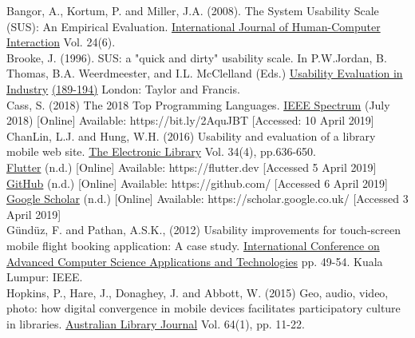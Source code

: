 \documentclass[version=last,fontsize=13pt]{scrartcl}
\begin{document}
Bangor, A., Kortum, P. and Miller, J.A. (2008). The System Usability Scale (SUS): An Empirical Evaluation. \underline{International Journal of Human-Computer Interaction} Vol. 24(6).\\

Brooke, J. (1996). SUS: a "quick and dirty" usability scale. In P.W.Jordan, B. Thomas, B.A. Weerdmeester, and I.L. McClelland (Eds.) \underline{Usability Evaluation in Industry} \underline{(189-194)} London: Taylor and Francis.\\


Cass, S. (2018) The 2018 Top Programming Languages.  \underline{IEEE Spectrum} (July 2018) [Online] Available: https://bit.ly/2AquJBT [Accessed: 10 April 2019]\\

ChanLin, L.J. and Hung, W.H. (2016) Usability and evaluation of a library mobile web site. \underline{The Electronic Library} Vol. 34(4), pp.636-650.\\

\underline{Flutter} (n.d.) [Online] Available: https://flutter.dev [Accessed 5 April 2019]\\

\underline{GitHub} (n.d.) [Online] Available: https://github.com/ [Accessed 6 April 2019]\\

\underline{Google Scholar} (n.d.) [Online] Available: https://scholar.google.co.uk/ [Accessed 3 April 2019]\\

Gündüz, F. and Pathan, A.S.K., (2012) Usability improvements for touch-screen mobile flight booking application: A case study.  \underline{International Conference on Advanced } \underline{Computer Science Applications and Technologies}  pp. 49-54. Kuala Lumpur: IEEE.\\

Hopkins, P., Hare, J., Donaghey, J. and Abbott, W. (2015) Geo, audio, video, photo: how digital convergence in mobile devices facilitates participatory culture in libraries. \underline{Australian Library Journal} Vol. 64(1), pp. 11-22.\\
\end{document}
